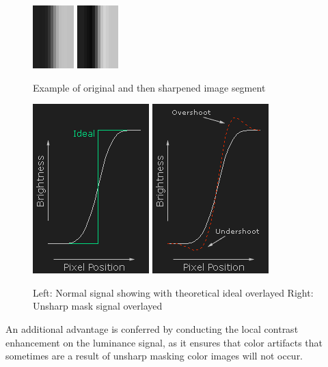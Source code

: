 \documentclass[twocolumn]{article}
\begin{document}
\begin{figure}[h!]
	\centering
	\includegraphics[scale=1.0]{unsharpmask3}
	\includegraphics[scale=1.0]{unsharpmask1}
	\caption{Example of original and then sharpened image segment\cite{unsharp}}
\end{figure}

\begin{figure}[h!]
	\centering
	\includegraphics[scale=0.5]{unsharpmask2}
	\includegraphics[scale=0.5]{unsharpmask}
	\caption{Left: Normal signal showing with theoretical ideal overlayed Right: Unsharp mask signal overlayed\cite{unsharp}}
\end{figure}

An additional advantage is conferred by conducting the local contrast enhancement on the luminance signal, as it ensures that color artifacts that sometimes are a result of unsharp masking color images will not occur.
\end{document}
